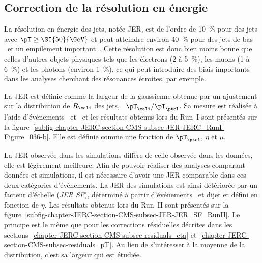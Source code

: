 \subsection{Correction de la résolution en énergie}\label{chapter-JERC-section-CMS-subsec-JER}
La résolution en énergie des jets, notée JER, est de l'ordre de \SI{10}{\%} pour des jets avec $\pT\geq\SI{50}{\GeV}$ et peut atteindre environ \SI{40}{\%} pour des jets de bas \pT\ et un empilement important~\cite{JERC_RunI}.
Cette résolution est donc bien moins bonne que celles d'autres objets physiques tels que les électrons (\num{2} à \SI{5}{\%}), les muons (\num{1} à \SI{6}{\%}) et les photons (environ \SI{1}{\%}), ce qui peut introduire des biais importants dans les analyses cherchant des résonances étroites, par exemple.
\par La JER est définie comme la largeur de la gaussienne obtenue par un ajustement sur la distribution de $R_\cali$ des jets, \ie\ $\pT_\cali/\pT_\ptcl$.
Sa mesure est réalisée à l'aide d'événements \Gjet\ et \Zjet\ et les résultats obtenus lors du Run~I sont présentés sur la figure~\ref{subfig-chapter-JERC-section-CMS-subsec-JER-JERC_RunI-Figure_036-b}.
Elle est définie comme une fonction de $\pT_\ptcl$, $\eta$ et $\mu$.
\par La JER observée dans les simulations diffère de celle observée dans les données, elle est légèrement meilleure.
Afin de pouvoir réaliser des analyses comparant données et simulations, il est nécessaire d'avoir une JER comparable dans ces deux catégories d'événements.
La JER des simulations est ainsi détériorée par un facteur d'échelle (\emph{JER SF}), déterminé à partir d'événements \Gjet\ et dijet et défini en fonction de $\eta$.
Les résultats obtenus lors du Run~II sont présentés sur la figure~\ref{subfig-chapter-JERC-section-CMS-subsec-JER-JER_SF_RunII}.
Le principe est le même que pour les corrections résiduelles décrites dans les sections~\ref{chapter-JERC-section-CMS-subsec-residuals_eta} et~\ref{chapter-JERC-section-CMS-subsec-residuals_pT}. Au lieu de s'intéresser à la moyenne de la distribution, c'est sa largeur qui est étudiée.
